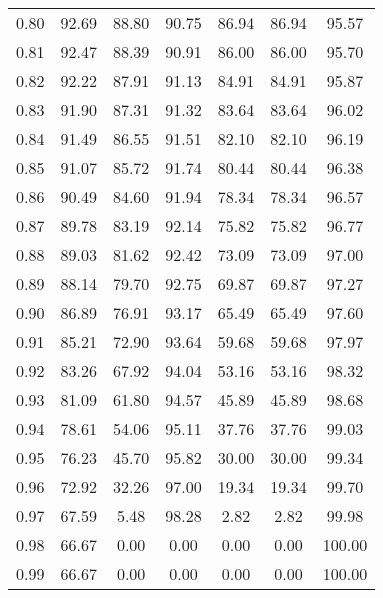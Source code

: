 \begin{tabular}{|c|c|c|c|c|c|c|}
      0.80 &     92.69 &     88.80 &      90.75 &   86.94 &      86.94 &         95.57 \\
      0.81 &     92.47 &     88.39 &      90.91 &   86.00 &      86.00 &         95.70 \\
      0.82 &     92.22 &     87.91 &      91.13 &   84.91 &      84.91 &         95.87 \\
      0.83 &     91.90 &     87.31 &      91.32 &   83.64 &      83.64 &         96.02 \\
      0.84 &     91.49 &     86.55 &      91.51 &   82.10 &      82.10 &         96.19 \\
      0.85 &     91.07 &     85.72 &      91.74 &   80.44 &      80.44 &         96.38 \\
      0.86 &     90.49 &     84.60 &      91.94 &   78.34 &      78.34 &         96.57 \\
      0.87 &     89.78 &     83.19 &      92.14 &   75.82 &      75.82 &         96.77 \\
      0.88 &     89.03 &     81.62 &      92.42 &   73.09 &      73.09 &         97.00 \\
      0.89 &     88.14 &     79.70 &      92.75 &   69.87 &      69.87 &         97.27 \\
      0.90 &     86.89 &     76.91 &      93.17 &   65.49 &      65.49 &         97.60 \\
      0.91 &     85.21 &     72.90 &      93.64 &   59.68 &      59.68 &         97.97 \\
      0.92 &     83.26 &     67.92 &      94.04 &   53.16 &      53.16 &         98.32 \\
      0.93 &     81.09 &     61.80 &      94.57 &   45.89 &      45.89 &         98.68 \\
      0.94 &     78.61 &     54.06 &      95.11 &   37.76 &      37.76 &         99.03 \\
      0.95 &     76.23 &     45.70 &      95.82 &   30.00 &      30.00 &         99.34 \\
      0.96 &     72.92 &     32.26 &      97.00 &   19.34 &      19.34 &         99.70 \\
      0.97 &     67.59 &      5.48 &      98.28 &    2.82 &       2.82 &         99.98 \\
      0.98 &     66.67 &      0.00 &       0.00 &    0.00 &       0.00 &        100.00 \\
      0.99 &     66.67 &      0.00 &       0.00 &    0.00 &       0.00 &        100.00 \\
\bottomrule
\end{tabular}
